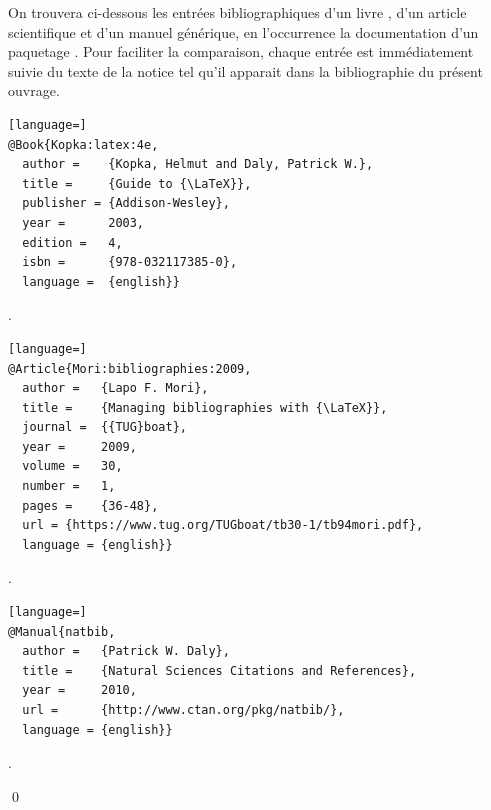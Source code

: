 \begin{exemple}
  \label{ex:bibliographie:bib}
  On trouvera ci-dessous les entrées bibliographiques d'un livre
  \citep{Kopka:latex:4e}, d'un article scientifique
  \citep{Mori:bibliographies:2009} et d'un manuel générique, en
  l'occurrence la documentation d'un paquetage \citep{natbib}. Pour
  faciliter la comparaison, chaque entrée est immédiatement suivie du
  texte de la notice tel qu'il apparait dans la bibliographie du
  présent ouvrage.

\begin{lstlisting}[language=]
@Book{Kopka:latex:4e,
  author =    {Kopka, Helmut and Daly, Patrick W.},
  title =     {Guide to {\LaTeX}},
  publisher = {Addison-Wesley},
  year =      2003,
  edition =   4,
  isbn =      {978-032117385-0},
  language =  {english}}
\end{lstlisting}

  \begin{framed}
    \noindent {}.
  \end{framed}

\begin{lstlisting}[language=]
@Article{Mori:bibliographies:2009,
  author =   {Lapo F. Mori},
  title =    {Managing bibliographies with {\LaTeX}},
  journal =  {{TUG}boat},
  year =     2009,
  volume =   30,
  number =   1,
  pages =    {36-48},
  url =	{https://www.tug.org/TUGboat/tb30-1/tb94mori.pdf},
  language = {english}}
\end{lstlisting}

  \begin{framed}
    \noindent {}.
  \end{framed}

\begin{lstlisting}[language=]
@Manual{natbib,
  author =   {Patrick W. Daly},
  title =    {Natural Sciences Citations and References},
  year =     2010,
  url =      {http://www.ctan.org/pkg/natbib/},
  language = {english}}
\end{lstlisting}

  \begin{framed}
    \noindent {}.
  \end{framed}
  \qed
\end{exemple}


